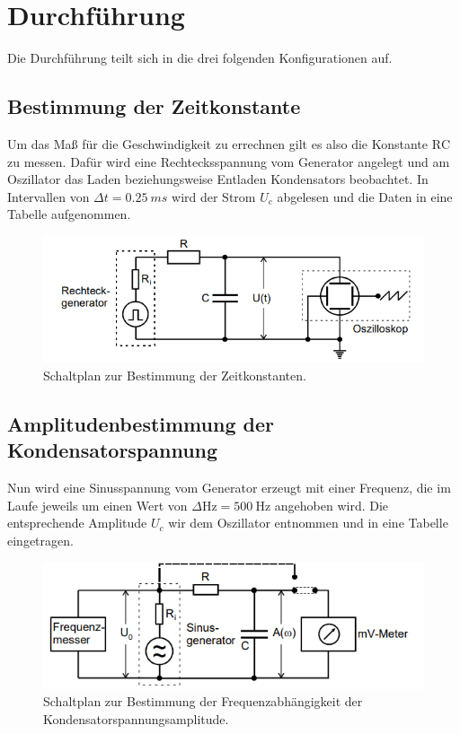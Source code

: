 \section{Durchführung}
Die Durchführung teilt sich in die  drei folgenden Konfigurationen auf.
\subsection{Bestimmung der Zeitkonstante}
Um das Maß für die Geschwindigkeit zu errechnen gilt es also die Konstante $\text{RC}$ zu messen.
Dafür wird eine Rechtecksspannung vom Generator angelegt und am Oszillator das Laden beziehungsweise Entladen
Kondensators beobachtet. In Intervallen von $\Delta t = \SI{0.25}{ms}$ wird der Strom $U_c$ abgelesen und die
Daten in eine Tabelle aufgenommen. 
\begin{figure}
    \centering
    \includegraphics[width=\textwidth]{bilder/RC.png}
    \caption{Schaltplan zur Bestimmung der Zeitkonstanten.\cite{skript}}
    \label{fig:RC}
\end{figure}

\subsection{Amplitudenbestimmung der Kondensatorspannung}
\label{sectionref}
Nun wird eine Sinusspannung vom Generator erzeugt mit einer Frequenz, die im Laufe jeweils um einen Wert
von $\Delta\si{\hertz}= \SI{500}{\hertz}$ angehoben wird. Die entsprechende Amplitude $U_c$ wir 
dem Oszillator entnommen und in eine Tabelle eingetragen.
 \begin{figure}
    \centering
    \includegraphics[width=\textwidth]{bilder/amplitude.png}
    \caption{Schaltplan zur Bestimmung der Frequenzabhängigkeit der Kondensatorspannungsamplitude.\cite{skript}}
    \label{fig:amp}
\end{figure}


